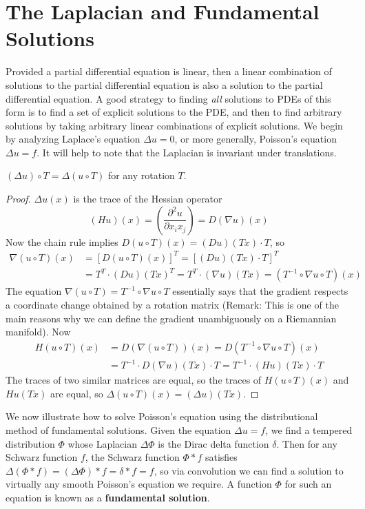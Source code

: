 \section{The Laplacian and Fundamental Solutions}

Provided a partial differential equation is linear, then a linear combination of solutions to the partial differential equation is also a solution to the partial differential equation. A good strategy to finding {\it all} solutions to PDEs of this form is to find a set of explicit solutions to the PDE, and then to find arbitrary solutions by taking arbitrary linear combinations of explicit solutions. We begin by analyzing Laplace's equation $\Delta u = 0$, or more generally, Poisson's equation $\Delta u = f$. It will help to note that the Laplacian is invariant under translations.

\begin{theorem}
    $(\Delta u) \circ T = \Delta (u \circ T)$ for any rotation $T$.
\end{theorem}
\begin{proof}
    $\Delta u(x)$ is the trace of the Hessian operator
    \[ (Hu)(x) = \left( \frac{\partial^2 u}{\partial x_ix_j} \right) = D(\nabla u)(x) \]
    Now the chain rule implies $D(u \circ T)(x) = (Du)(Tx) \cdot T$, so
    \begin{align*}
        \nabla (u \circ T)(x) &= [D(u \circ T)(x)]^T = [(Du)(Tx) \cdot T]^T\\
        &= T^T \cdot (Du)(Tx)^T = T^T \cdot (\nabla u)(Tx) = (T^{-1} \circ \nabla u \circ T)(x)
    \end{align*}
    The equation $\nabla (u \circ T) = T^{-1} \circ \nabla u \circ T$ essentially says that the gradient respects a coordinate change obtained by a rotation matrix (Remark: This is one of the main reasons why we can define the gradient unambiguously on a Riemannian manifold). Now
    \begin{align*}
        H(u \circ T)(x) &= D(\nabla (u \circ T))(x) = D(T^{-1} \circ \nabla u \circ T)(x)\\
        &= T^{-1} \cdot D(\nabla u)(Tx) \cdot T = T^{-1} \cdot (Hu)(Tx) \cdot T
    \end{align*}
    The traces of two similar matrices are equal, so the traces of $H(u \circ T)(x)$ and $Hu(Tx)$ are equal, so $\Delta (u \circ T)(x) = (\Delta u)(Tx)$.
\end{proof}

We now illustrate how to solve Poisson's equation using the distributional method of fundamental solutions. Given the equation $\Delta u = f$, we find a tempered distribution $\Phi$ whose Laplacian $\Delta \Phi$ is the Dirac delta function $\delta$. Then for any Schwarz function $f$, the Schwarz function $\Phi * f$ satisfies $\Delta(\Phi * f) = (\Delta \Phi) * f = \delta * f = f$, so via convolution we can find a solution to virtually any smooth Poisson's equation we require. A function $\Phi$ for such an equation is known as a {\bf fundamental solution}.

